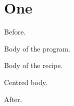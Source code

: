 \documentclass{article}
\begin{document}
\section{One}
Before.
\begin{program}
Body of the program.
\caption[Short]{A plain-style caption}
\end{program}
\begin{recipe}
\caption{A ruled caption}
Body of the recipe.
\end{recipe}
\begin{program}
\begin{center}
Centred body.
\caption{Nested in center}
\end{center}
\end{program}
After.
\end{document}
